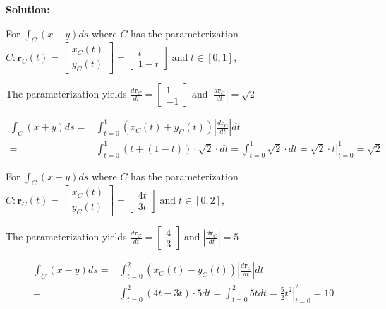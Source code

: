 \documentclass{article}
\newcommand{\abs}[1]{\left|#1\right|}
\newcommand{\at}[1]{\left. #1 \right|}
\newcommand{\dr}[1]{\textcolor{dark_red}{#1}}
\begin{document}

\dr{\textbf{Solution:}}

\begin{framed}
\dr{For \(\int_C (x + y)ds\) where \(C\) has the parameterization \(C: \mathbf{r}_C(t) = \begin{bmatrix} x_C(t) \\ y_C(t) \end{bmatrix} = \begin{bmatrix} t \\ 1 - t \end{bmatrix} \;\text{and}\; t \in [0,1]\),}

\dr{The parameterization yields \(\frac{d\mathbf{r}_C}{dt} = \begin{bmatrix} 1 \\ -1 \end{bmatrix} \;\text{and}\; \abs{\frac{d\mathbf{r}_C}{dt}} = \sqrt{2}\)}

\dr{\begin{align*}
\int_C (x + y)ds = & \int_{t = 0}^1 (x_C(t) + y_C(t))\abs{\frac{d\mathbf{r}_C}{dt}}dt \\
= & \int_{t = 0}^1 (t + (1-t))\cdot \sqrt{2} \cdot dt 
= \int_{t = 0}^1 \sqrt{2} \cdot dt 
= \at{\sqrt{2}\cdot t}_{t = 0}^1 
= \sqrt{2}
\end{align*}}
\end{framed}

\begin{framed}
\dr{For \(\int_C (x - y)ds\) where \(C\) has the parameterization \(C: \mathbf{r}_C(t) = \begin{bmatrix} x_C(t) \\ y_C(t) \end{bmatrix} = \begin{bmatrix} 4t \\ 3t \end{bmatrix} \;\text{and}\; t \in [0,2]\),}

\dr{The parameterization yields \(\frac{d\mathbf{r}_C}{dt} = \begin{bmatrix} 4 \\ 3 \end{bmatrix} \;\text{and}\; \abs{\frac{d\mathbf{r}_C}{dt}} = 5\)}

\dr{\begin{align*}
\int_C (x - y)ds = & \int_{t = 0}^2 (x_C(t) - y_C(t))\abs{\frac{d\mathbf{r}_C}{dt}}dt \\ 
= & \int_{t = 0}^2 (4t - 3t) \cdot 5dt 
= \int_{t = 0}^2 5t dt 
= \at{\frac{5}{2}t^2}_{t=0}^2 
= 10
\end{align*}}
\end{framed}
\end{document}
